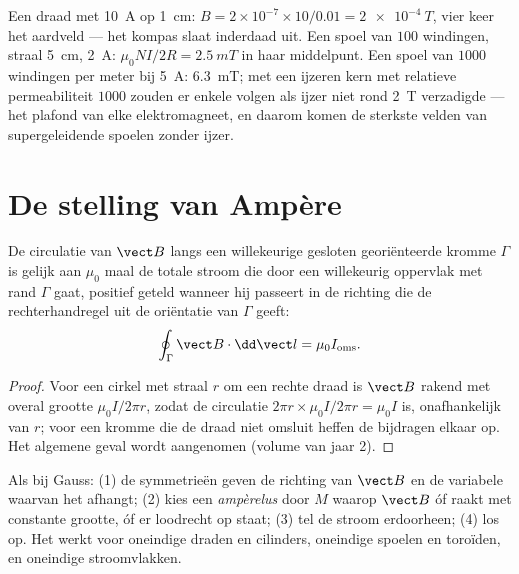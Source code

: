 \begin{example}\label{ex:b1:magnetostatics:orders}
Een draad met \qty{10}{A} op \qty{1}{cm}: $B = 2 \times 10^{-7} \times 10/0.01 =
\qty{2e-4}{T}$, vier keer het aardveld --- het kompas slaat inderdaad uit.
Een spoel van $100$ windingen, straal \qty{5}{cm}, \qty{2}{A}: $\mu_0NI/2R =
\qty{2.5}{mT}$ in haar middelpunt. Een spoel van $1000$ windingen per meter bij
\qty{5}{A}: \qty{6.3}{mT}; met een ijzeren kern met relatieve permeabiliteit
$1000$ zouden er enkele  volgen als ijzer niet rond
\qty{2}{T} verzadigde --- het plafond van elke elektromagneet, en daarom komen
de sterkste velden van supergeleidende spoelen zonder ijzer.
\end{example}

\section{De stelling van Ampère}

\begin{theorem}[Ampère]\label{thm:b1:magnetostatics:ampere}
De circulatie van $\vect B$ langs een willekeurige gesloten georiënteerde kromme $\Gamma$
is gelijk aan $\mu_0$ maal de totale stroom die door een willekeurig oppervlak met rand
$\Gamma$ gaat, positief geteld wanneer hij passeert in de richting die de
rechterhandregel uit de oriëntatie van $\Gamma$ geeft:
\[
\oint_\Gamma \vect B\cdot\dd\vect l = \mu_0 I_{\text{oms}} .
\]
\end{theorem}

\begin{proof}
Voor een cirkel met straal $r$ om een rechte draad is $\vect B$
rakend met overal grootte $\mu_0I/2\pi r$, zodat de circulatie
$2\pi r \times \mu_0I/2\pi r = \mu_0I$ is, onafhankelijk van $r$; voor een kromme die de
draad niet omsluit heffen de bijdragen elkaar op. Het algemene geval wordt
aangenomen (volume van jaar 2).
\end{proof}

\begin{method}\label{meth:b1:magnetostatics:ampere}
Als bij Gauss: (1) de symmetrieën geven de richting van $\vect B$ en de
variabele waarvan het afhangt; (2) kies een \emph{ampèrelus} door $M$
waarop $\vect B$ óf raakt met constante grootte, óf er
loodrecht op staat; (3) tel de stroom erdoorheen; (4) los op. Het werkt
voor oneindige draden en cilinders, oneindige spoelen en toroïden, en
oneindige stroomvlakken.
\end{method}


